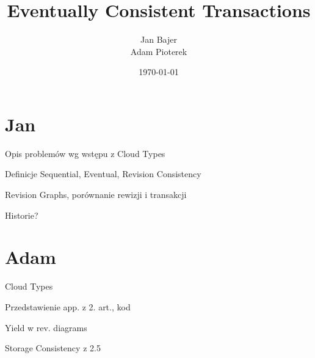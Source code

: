\documentclass{beamer}
\title{Eventually Consistent Transactions}
\date{\today}
\author{Jan Bajer\\Adam Pioterek}
\begin{document}
\begin{frame}
\titlepage{}
\end{frame}

\section{Jan}

\begin{frame}{Opis problemów wg wstępu z Cloud Types}
\end{frame}

\begin{frame}{Definicje Sequential, Eventual, Revision Consistency}
\end{frame}

\begin{frame}{Revision Graphs, porównanie rewizji i transakcji}
\end{frame}

\begin{frame}{Historie?}
\end{frame}

\section{Adam}

\begin{frame}{Cloud Types}
\end{frame}

\begin{frame}{Przedstawienie app. z 2. art., kod}
\end{frame}

\begin{frame}{Yield w rev. diagrams}
\end{frame}

\begin{frame}{Storage Consistency z 2.5}
\end{frame}
\end{document}
